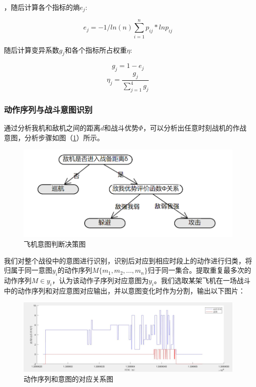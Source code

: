 \documentclass{my_paper}
\begin{document}
，随后计算各个指标的熵$e_j$:

\begin{equation}
    e_j = -1/ln(n) \sum_{i=1}^{n} p_{ij}*ln p_{ij}
\end{equation}

随后计算变异系数$g_j$和各个指标所占权重$ \eta $:

\begin{equation}
    g_j = 1-e_j
\end{equation}
\begin{equation}
    \eta_j = \frac{g_j}{\sum_{j=1}^{4}g_j}
\end{equation}

\subsubsection{动作序列与战斗意图识别}

通过分析我机和敌机之间的距离$d$和战斗优势$\Phi$，可以分析出任意时刻战机的作战意图，分析步骤如图（\ref{pdjc}）所示。

\begin {figure}[h]
\centering %
\includegraphics[width=\textwidth]{yitu.png}
\caption{飞机意图判断决策图} %
\label{pdjc}
\end {figure}

我们对整个战役中的意图进行识别，识别后对应到相应时段上的动作进行归类，将归属于同一意图$y_i$的动作序列$M\{m_1,m_2,...,m_n\}$归于同一集合。提取重复最多次的动作序列$M\in y_i$，认为该动作子序列对应意图为$y_i$。我们选取某架飞机在一场战斗中的动作序列和对应意图对应输出，并以意图变化时作为分割，输出以下图片：

\begin {figure}[h]
\centering %
\includegraphics[width=\textwidth]{9.jpg}
\caption{动作序列和意图的对应关系图} %
\label{five}
\end {figure}
\end{document}
